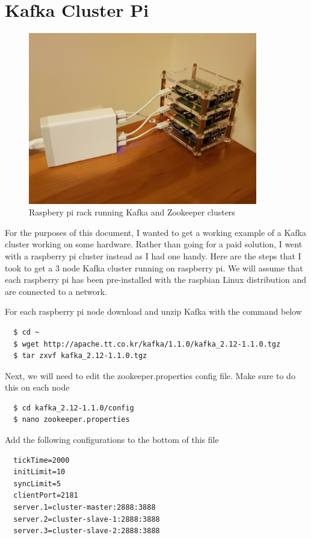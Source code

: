 \section{Kafka Cluster Pi}

\begin{figure}[H]
  \centering
  \includegraphics[scale=0.5,width=100mm]{./images/pi-cluster.jpg}
  \caption{Raspbery pi rack running Kafka and Zookeeper clusters}
  \label{fig:pi-rack}
\end{figure}

For the purposes of this document, I wanted to get a working example of a Kafka cluster working on some hardware. Rather than going for a paid solution, I went with a raspberry pi cluster instead as I had one handy. Here are the steps that I took to get a 3 node Kafka cluster running on raspberry pi. We will assume that each raspberry pi has been pre-installed with the raspbian Linux distribution and are connected to a network.

For each raspberry pi node download and unzip Kafka with the command below

\begin{verbatim}
  $ cd ~
  $ wget http://apache.tt.co.kr/kafka/1.1.0/kafka_2.12-1.1.0.tgz
  $ tar zxvf kafka_2.12-1.1.0.tgz
\end{verbatim}

Next, we will need to edit the zookeeper.properties config file. Make sure to do this on each node

\begin{verbatim}
  $ cd kafka_2.12-1.1.0/config
  $ nano zookeeper.properties
\end{verbatim}

Add the following configurations to the bottom of this file

\begin{verbatim}
  tickTime=2000
  initLimit=10
  syncLimit=5
  clientPort=2181
  server.1=cluster-master:2888:3888
  server.2=cluster-slave-1:2888:3888
  server.3=cluster-slave-2:2888:3888
\end{verbatim}

